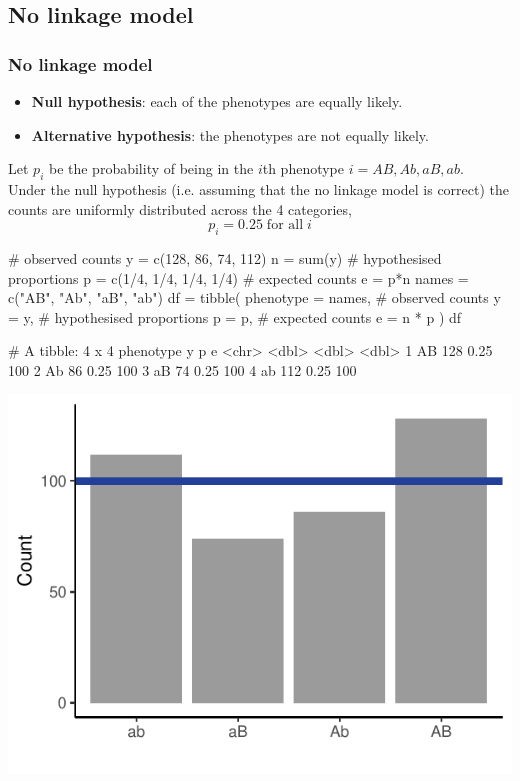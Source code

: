 \documentclass[a4paper]{article}
\begin{document}
\subsection{No linkage model}
\subsubsection{No linkage model}
\begin{itemize}
	\item \textbf{Null hypothesis}: each of the phenotypes are equally likely.
	\item \textbf{Alternative hypothesis}: the phenotypes are not equally likely.
\end{itemize}
Let \( p_i \) be the probability of being in the \( i \)th phenotype \( i = AB,Ab,aB,ab \).\\
Under the null hypothesis (i.e. assuming that the no linkage model is correct) the counts are uniformly distributed across the 4 categories,
\[
	p_i = 0.25 \;\text{for all}\; i
\]
\begin{Schunk}
\begin{Sinput}
# observed counts
y = c(128, 86, 74, 112) 
n = sum(y)
# hypothesised proportions
p = c(1/4, 1/4, 1/4, 1/4) 
# expected counts
e = p*n
names = c("AB", "Ab", "aB", "ab")
df = tibble(
  phenotype = names,
  # observed counts
  y = y,
  # hypothesised proportions
  p = p,
  # expected counts
  e = n * p
)
df
\end{Sinput}
\begin{Soutput}
# A tibble: 4 x 4
  phenotype     y     p     e
  <chr>     <dbl> <dbl> <dbl>
1 AB          128  0.25   100
2 Ab           86  0.25   100
3 aB           74  0.25   100
4 ab          112  0.25   100
\end{Soutput}


{\centering \includegraphics[width=\maxwidth]{figure/listings-unnamed-chunk-15-1} 

}

\end{Schunk}
\end{document}
